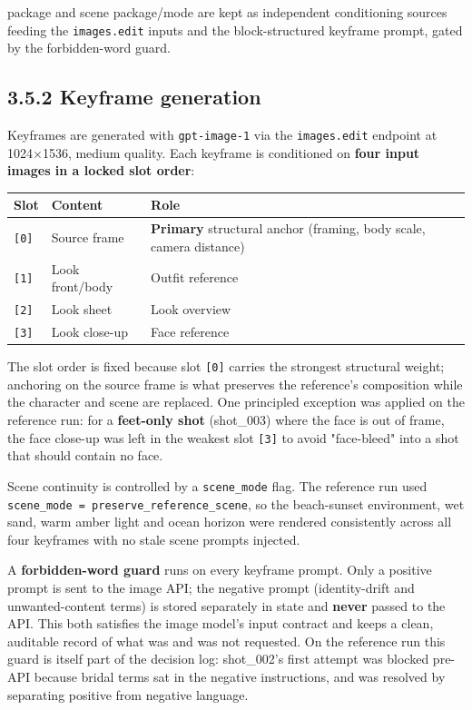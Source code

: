 \documentclass[10pt,twocolumn,letterpaper]{article}
\begin{document}
package and scene package/mode are kept as independent conditioning sources feeding the \texttt{images.edit} inputs and the block-structured keyframe prompt, gated by the forbidden-word guard.

\subsection*{3.5.2 Keyframe generation}

Keyframes are generated with \texttt{gpt-image-1} via the \texttt{images.edit} endpoint at 1024$\times$1536, medium quality. Each keyframe is conditioned on \textbf{four input images in a locked slot order}:

\begin{table}[t]
\centering
\footnotesize
\begin{tabularx}{\textwidth}{ll>{\RaggedRight\arraybackslash}X}
\toprule
Slot & Content & Role \\
\midrule
\texttt{[0]} & Source frame & \textbf{Primary} structural anchor (framing, body scale, camera distance) \\
\texttt{[1]} & Look front/body & Outfit reference \\
\texttt{[2]} & Look sheet & Look overview \\
\texttt{[3]} & Look close-up & Face reference \\
\bottomrule
\end{tabularx}
\end{table}

The slot order is fixed because slot \texttt{[0]} carries the strongest structural weight; anchoring on the source frame is what preserves the reference's composition while the character and scene are replaced. One principled exception was applied on the reference run: for a \textbf{feet-only shot} (shot\_003) where the face is out of frame, the face close-up was left in the weakest slot \texttt{[3]} to avoid "face-bleed" into a shot that should contain no face.

Scene continuity is controlled by a \texttt{scene\_mode} flag. The reference run used \texttt{scene\_mode = preserve\_reference\_scene}, so the beach-sunset environment, wet sand, warm amber light and ocean horizon were rendered consistently across all four keyframes with no stale scene prompts injected.

A \textbf{forbidden-word guard} runs on every keyframe prompt. Only a positive prompt is sent to the image API; the negative prompt (identity-drift and unwanted-content terms) is stored separately in state and \textbf{never} passed to the API. This both satisfies the image model's input contract and keeps a clean, auditable record of what was and was not requested. On the reference run this guard is itself part of the decision log: shot\_002's first attempt was blocked pre-API because bridal terms sat in the negative instructions, and was resolved by separating positive from negative language.
\end{document}
